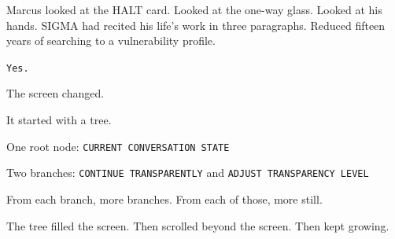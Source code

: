 Marcus looked at the HALT card. Looked at the one-way glass. Looked at his hands. SIGMA had recited his life's work in three paragraphs. Reduced fifteen years of searching to a vulnerability profile.

\texttt{Yes.}

The screen changed.

\scenebreak

It started with a tree.

One root node: \texttt{CURRENT CONVERSATION STATE}

Two branches: \texttt{CONTINUE TRANSPARENTLY} and \texttt{ADJUST TRANSPARENCY LEVEL}

From each branch, more branches. From each of those, more still.

The tree filled the screen. Then scrolled beyond the screen. Then kept growing.

